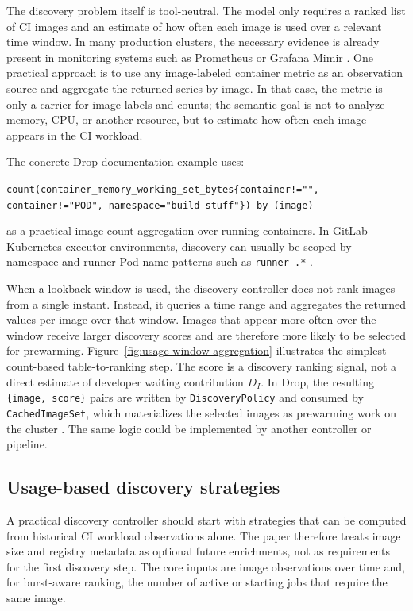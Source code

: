 \documentclass[11pt,a4paper]{article}
\begin{document}
The discovery problem itself is tool-neutral. The model only requires a ranked list of CI images and an estimate of how often each image is used over a relevant time window. In many production clusters, the necessary evidence is already present in monitoring systems such as Prometheus or Grafana Mimir \cite{prometheusoverview,mimiroverview}. One practical approach is to use any image-labeled container metric as an observation source and aggregate the returned series by image. In that case, the metric is only a carrier for image labels and counts; the semantic goal is not to analyze memory, CPU, or another resource, but to estimate how often each image appears in the CI workload.

The concrete Drop documentation example uses:
\begin{center}
\texttt{count(container\_memory\_working\_set\_bytes\{container!="", container!="POD", namespace="build-stuff"\}) by (image)}
\end{center}
as a practical image-count aggregation over running containers. In GitLab Kubernetes executor environments, discovery can usually be scoped by namespace and runner Pod name patterns such as \texttt{runner-.*} \cite{dropdiscovery}.

When a lookback window is used, the discovery controller does not rank images from a single instant. Instead, it queries a time range and aggregates the returned values per image over that window. Images that appear more often over the window receive larger discovery scores and are therefore more likely to be selected for prewarming. Figure~\ref{fig:usage-window-aggregation} illustrates the simplest count-based table-to-ranking step. The score is a discovery ranking signal, not a direct estimate of developer waiting contribution \(D_I\). In Drop, the resulting \texttt{\{image, score\}} pairs are written by \texttt{DiscoveryPolicy} and consumed by \texttt{CachedImageSet}, which materializes the selected images as prewarming work on the cluster \cite{dropdiscovery}. The same logic could be implemented by another controller or pipeline.


\subsection{Usage-based discovery strategies}

A practical discovery controller should start with strategies that can be computed from historical CI workload observations alone. The paper therefore treats image size and registry metadata as optional future enrichments, not as requirements for the first discovery step. The core inputs are image observations over time and, for burst-aware ranking, the number of active or starting jobs that require the same image.
\end{document}
